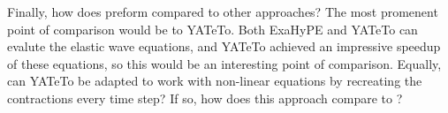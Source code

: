 
Finally, how does \phlat preform compared to other approaches?
The most promenent point of comparison would be to YATeTo.
Both ExaHyPE and YATeTo can evalute the elastic wave equations, and YATeTo achieved an impressive speedup of these equations, so this would be an interesting point of comparison.
Equally, can YATeTo be adapted to work with non-linear equations by recreating the contractions every time step?
If so, how does this approach compare to \phlat?

